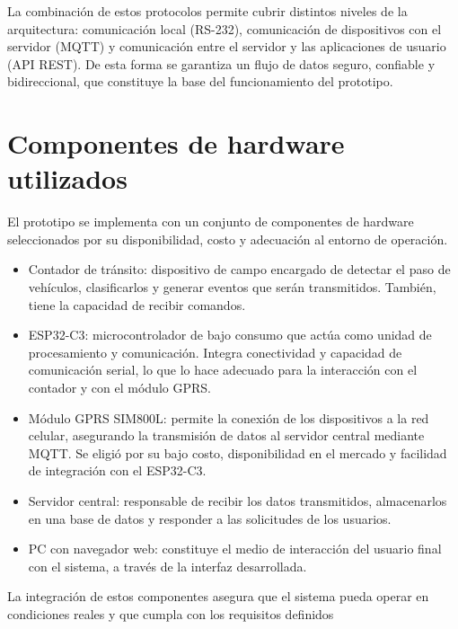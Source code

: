 La combinación de estos protocolos permite cubrir distintos niveles de la arquitectura: comunicación local (RS-232), comunicación de dispositivos con el servidor (MQTT) y comunicación entre el servidor y las aplicaciones de usuario (API REST). De esta forma se garantiza un flujo de datos seguro, confiable y bidireccional, que constituye la base del funcionamiento del prototipo.




\section{Componentes de hardware utilizados}

El prototipo se implementa con un conjunto de componentes de hardware seleccionados por su disponibilidad, costo y adecuación al entorno de operación.

\begin{itemize}

\item Contador de tránsito: dispositivo de campo encargado de detectar el paso de vehículos, clasificarlos y generar eventos que serán transmitidos. También, tiene la capacidad de recibir comandos.

\item ESP32-C3: microcontrolador de bajo consumo que actúa como unidad de procesamiento y comunicación. Integra conectividad y capacidad de comunicación serial, lo que lo hace adecuado para la interacción con el contador y con el módulo GPRS.

\item Módulo GPRS SIM800L: permite la conexión de los dispositivos a la red celular, asegurando la transmisión de datos al servidor central mediante MQTT. Se eligió por su bajo costo, disponibilidad en el mercado y facilidad de integración con el ESP32-C3.

\item Servidor central: responsable de recibir los datos transmitidos, almacenarlos en una base de datos y responder a las solicitudes de los usuarios.

\item PC con navegador web: constituye el medio de interacción del usuario final con el sistema, a través de la interfaz desarrollada.
\end{itemize}

La integración de estos componentes asegura que el sistema pueda operar en condiciones reales y que cumpla con los requisitos definidos



